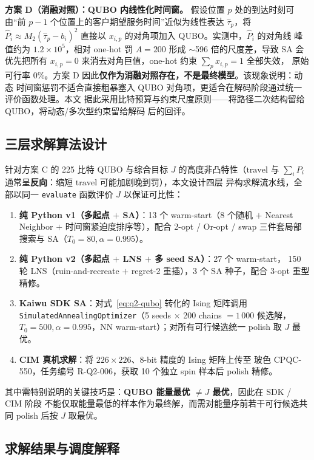 \documentclass[UTF8,12pt,a4paper]{ctexart}
\begin{document}
\textbf{方案 D（消融对照）：QUBO 内线性化时间窗。} 假设位置 $p$ 处的到达时刻可由``前 $p-1$
个位置上的客户期望服务时间''近似为线性表达 $\hat\tau_p$，将 $\hat P_i\approx
M_2(\hat\tau_p-b_i)^{2}$ 直接以 $x_{i,p}$ 的对角项加入 QUBO。实测中，$\hat P_i$ 的对角线
峰值约为 $1.2\times 10^{5}$，相对 one-hot 罚 $A=200$ 形成 $\sim$596 倍的尺度差，导致 SA
会优先把所有 $x_{i,p}\!=\!0$ 来消去对角巨值，one-hot 约束 $\sum_p x_{i,p}=1$ 全部失效，
原始可行率 0\%。方案 D 因此\textbf{仅作为消融对照存在，不是最终模型}。该现象说明：动态
时间窗惩罚不适合直接粗暴塞入 QUBO 对角项，更适合在解码阶段通过统一评价函数处理。本文
据此采用比特预算与约束尺度原则——将路径二次结构留给 QUBO，将动态/多次型约束留给解码
后的回评。

\subsection{三层求解算法设计}
\label{subsec:q2-algo}

针对方案 C 的 225 比特 QUBO 与综合目标 $J$ 的高度非凸特性（$\mathrm{travel}$ 与
$\sum_i P_i$ 通常呈\textbf{反向}：缩短 $\mathrm{travel}$ 可能加剧晚到罚），本文设计四层
异构求解流水线，全部以同一 \texttt{evaluate} 函数评价 $J$ 以保证可比性：
\begin{enumerate}
  \item[(i)] \textbf{纯 Python v1（多起点 $+$ SA）}：13 个 warm-start（8 个随机 $+$
    Nearest Neighbor $+$ 时间窗紧迫度排序等），配合 2-opt / Or-opt / swap 三件套局部
    搜索与 SA（$T_0=80,\alpha=0.995$）。
  \item[(ii)] \textbf{纯 Python v2（多起点 $+$ LNS $+$ 多 seed SA）}：27 个 warm-start，
    150 轮 LNS\cite{shaw1998lns,ropke2006alns}（ruin-and-recreate $+$ regret-2 重插），3 个 SA 种子，配合 3-opt 重型精修。
  \item[(iii)] \textbf{Kaiwu SDK SA}：对式~\eqref{eq:q2-qubo} 转化的 Ising 矩阵调用
    \texttt{SimulatedAnnealingOptimizer}（5 seeds $\times$ 200 chains $=1\,000$ 候选解，
    $T_0=500,\alpha=0.995$，NN warm-start）；对所有可行候选统一 polish 取 $J$ 最优。
  \item[(iv)] \textbf{CIM 真机求解}：将 $226\times 226$、8-bit 精度的 Ising 矩阵上传至
    玻色 CPQC-550，任务编号 R-Q2-006，获取 10 个独立 spin 样本后 polish 精修。
\end{enumerate}
其中需特别说明的关键技巧是：\textbf{QUBO 能量最优 $\ne J$ 最优}，因此在 SDK / CIM 阶段
不能仅取能量最低的样本作为最终解，而需对能量序前若干可行候选共同 polish 后按 $J$ 取最优。

\subsection{求解结果与调度解释}
\label{subsec:q2-result}
\end{document}
